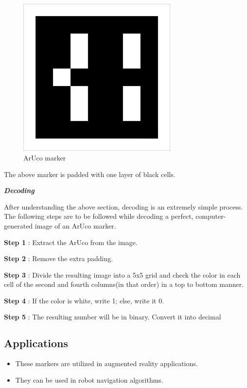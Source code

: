 \documentclass[]{article}
\providecommand{\tightlist}{%
  \setlength{\itemsep}{0pt}\setlength{\parskip}{0pt}}
\begin{document}
\begin{figure}[htbp]
\centering
\includegraphics[width = 8cm]{images/Aruco markers/3.png}
\caption{ArUco marker}
\end{figure}

The above marker is padded with one layer of black cells.

\emph{\textbf{Decoding}}

After understanding the above section, decoding is an extremely simple
process. The following steps are to be followed while decoding a
perfect, computer-generated image of an ArUco marker.

\textbf{Step 1} : Extract the ArUco from the image.

\textbf{Step 2} : Remove the extra padding.

\textbf{Step 3} : Divide the resulting image into a 5x5 grid and check
the color in each cell of the second and fourth columns(in that order)
in a top to bottom manner.

\textbf{Step 4} : If the color is white, write 1; else, write it 0.

\textbf{Step 5} : The resulting number will be in binary. Convert it
into decimal

\subsection{Applications}\label{applications}

\begin{itemize}
\tightlist
\item
  These markers are utilized in augmented reality applications.
\item
  They can be used in robot navigation algorithms.
\end{itemize}
\end{document}
